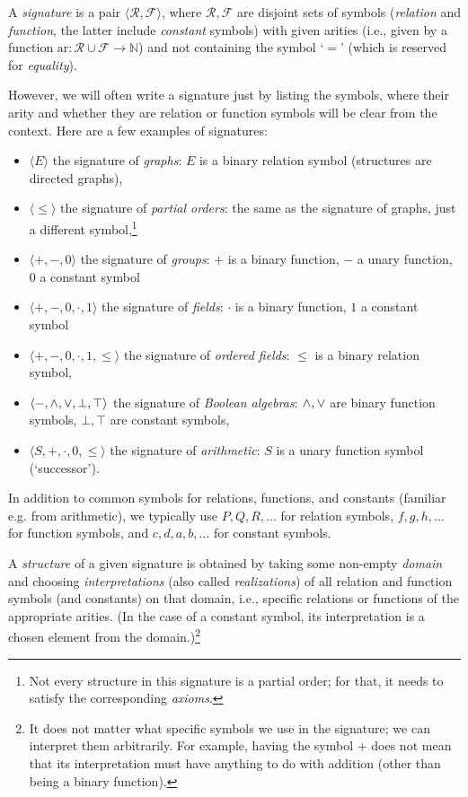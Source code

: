 \begin{definition}
    A \emph{signature} is a pair $\langle\mathcal R,\mathcal F\rangle$, where $\mathcal R,\mathcal F$ are disjoint sets of symbols (\emph{relation} and \emph{function}, the latter include \emph{constant} symbols) with given arities (i.e., given by a function $\mathrm{ar}\colon \mathcal R\cup\mathcal F\to\mathbb N$) and not containing the symbol `$=$' (which is reserved for \emph{equality}).
\end{definition}

However, we will often write a signature just by listing the symbols, where their arity and whether they are relation or function symbols will be clear from the context. Here are a few examples of signatures:
\begin{itemize}
    \item $\langle E \rangle$ the signature of \emph{graphs}: $E$ is a binary relation symbol (structures are directed graphs),
    \item $\langle \leq \rangle$ the signature of \emph{partial orders}: the same as the signature of graphs, just a different symbol,\footnote{Not every structure in this signature is a partial order; for that, it needs to satisfy the corresponding \emph{axioms}.}
    \item $\langle +, -, 0\rangle$ the signature of \emph{groups}: $+$ is a binary function, $-$ a unary function, $0$ a constant symbol
    \item $\langle +, -, 0,\cdot,1\rangle$ the signature of \emph{fields}: $\cdot$ is a binary function, $1$ a constant symbol
    \item $\langle +, -, 0,\cdot,1,\leq\rangle$ the signature of \emph{ordered fields}: $\leq$ is a binary relation symbol,
    \item $\langle -,{\land},{\lor},\bot,\top\rangle$ the signature of \emph{Boolean algebras}: ${\land},{\lor}$ are binary function symbols, $\bot,\top$ are constant symbols,
    \item $\langle S,+,\cdot,0,\leq\rangle$ the signature of \emph{arithmetic}: $S$ is a unary function symbol (`successor').
\end{itemize}
In addition to common symbols for relations, functions, and constants (familiar e.g. from arithmetic), we typically use $P,Q,R,\dots$ for relation symbols, $f,g,h,\dots$ for function symbols, and $c,d,a,b,\dots$ for constant symbols.

A \emph{structure} of a given signature is obtained by taking some non-empty \emph{domain} and choosing \emph{interpretations} (also called \emph{realizations}) of all relation and function symbols (and constants) on that domain, i.e., specific relations or functions of the appropriate arities. (In the case of a constant symbol, its interpretation is a chosen element from the domain.)\footnote{It does not matter what specific symbols we use in the signature; we can interpret them arbitrarily. For example, having the symbol $+$ does not mean that its interpretation must have anything to do with addition (other than being a binary function).}

